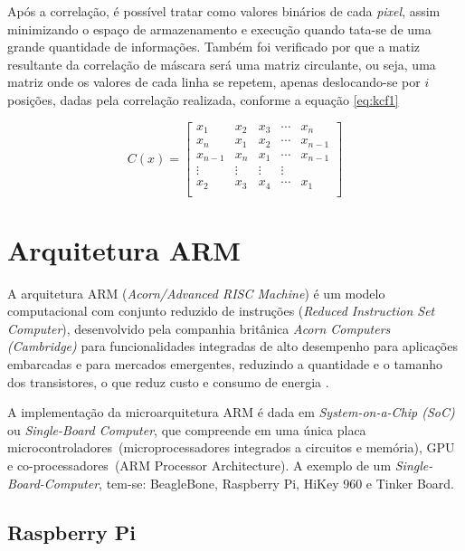 \documentclass[12pt,oneside,a4paper,chapter=TITLE,section=TITLE,sumario=tradicional]{abntex2}
\begin{document}
Após a correlação, é possível tratar como valores binários de cada \textit{pixel}, assim minimizando o espaço de armazenamento e execução quando tata-se de uma grande quantidade de informações. Também foi verificado por  que a matiz resultante da correlação de máscara será uma matriz circulante, ou seja, uma matriz onde os valores de cada linha se repetem, apenas deslocando-se por $i$ posições, dadas pela correlação realizada, conforme a equação \ref{eq:kcf1}

\begin{equation}
\label{eq:kcf1}
C(x) = 
\begin{bmatrix}
x_1 & x_2 & x_3 & \cdots & x_n\\
x_n & x_1 & x_2 & \cdots & x_{n-1} \\
x_{n-1} & x_n & x_1 & \cdots & x_{n-1} \\
\vdots & \vdots & \vdots & \vdots & \\
x_2 & x_3 & x_4 & \cdots & x_1\\
\end{bmatrix}
\end{equation}


\section{Arquitetura ARM}

A arquitetura ARM (\textit{Acorn/Advanced RISC Machine}) é um modelo computacional com conjunto reduzido de instruções (\textit{Reduced Instruction Set Computer}), desenvolvido pela companhia britânica \textit{Acorn Computers (Cambridge)} para funcionalidades integradas de alto desempenho para aplicações embarcadas e para mercados emergentes, reduzindo a quantidade e o tamanho dos transistores, o que reduz custo e consumo de energia \cite{armv8}.

A implementação da microarquitetura ARM é dada em \textit{System-on-a-Chip (SoC)} ou \textit{Single-Board Computer}, que compreende em uma única placa microcontroladores~(microprocessadores integrados a circuitos e memória), GPU e co-processadores~(ARM Processor Architecture).
A exemplo de um \textit{Single-Board-Computer}, tem-se: BeagleBone, Raspberry Pi, HiKey 960 e Tinker Board.

\subsection{Raspberry Pi}
\label{sec:raspberry}
\end{document}
